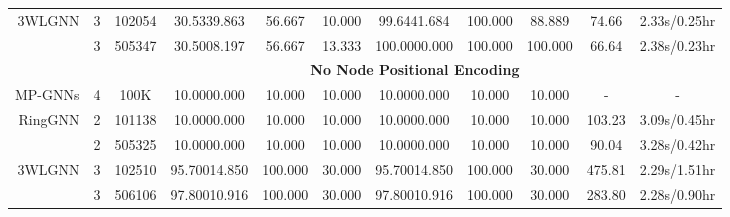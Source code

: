 \documentclass{article}
\begin{document}
\begin{table}[t]
{\begin{tabular}{rcc|ccc|ccc|cc}
        3WLGNN & 3 & 102054 & 30.5339.863 & 56.667 & 10.000 & 99.6441.684 & 100.000 & 88.889 & 74.66 & 2.33s/0.25hr   \\
        & 3 & 505347 & 30.5008.197 & 56.667 & 13.333 & 100.0000.000 & 100.000 & 100.000 & 66.64 & 2.38s/0.23hr \\
        \midrule
        & & \multicolumn{9}{c}{\textbf{No Node Positional Encoding}} \\
        \midrule
        MP-GNNs & 4 & 100K & 10.0000.000 & 10.000 & 10.000 & 10.0000.000 & 10.000 & 10.000 & - & - \\
        RingGNN & 2 & 101138 & 10.0000.000 & 10.000 & 10.000 & 10.0000.000 & 10.000 & 10.000 & 103.23 & 3.09s/0.45hr \\
        & 2 & 505325 & 10.0000.000 & 10.000 & 10.000 & 10.0000.000 & 10.000 & 10.000 & 90.04 & 3.28s/0.42hr \\
        3WLGNN & 3 & 102510 & 95.70014.850 & 100.000 & 30.000 & 95.70014.850 & 100.000 & 30.000 & 475.81 & 2.29s/1.51hr  \\
        & 3 & 506106 & 97.80010.916 & 100.000 & 30.000 & 97.80010.916 & 100.000 & 30.000 & 283.80 & 2.28s/0.90hr \\
        \bottomrule
    \end{tabular}
    }
    \label{tab:csl}
\end{table}
\end{document}
